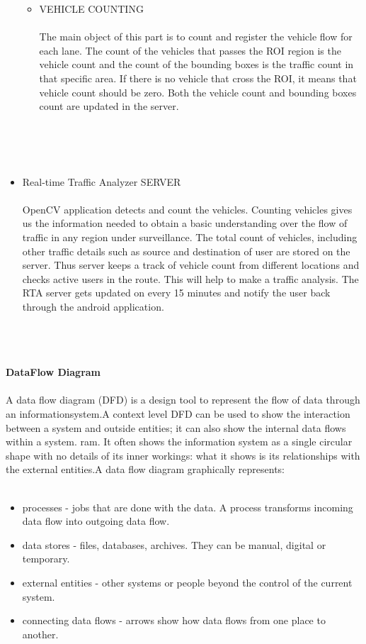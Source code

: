 \begin{itemize}
\begin{itemize}
\item VEHICLE COUNTING\\ \\
The main object of this part is to count and register the vehicle flow for each lane. The count of the vehicles that passes the ROI region is the vehicle count and the count of the bounding boxes is the traffic count in that specific area. If there is no vehicle that cross the ROI, it means that vehicle count should be zero. Both the vehicle count and bounding boxes count are updated in the server. \\ \\
\end{itemize}\\ \\
\newpage
\item Real-time Traffic Analyzer SERVER\\ \\
OpenCV application detects and count the vehicles. Counting vehicles gives us the information needed to obtain a basic understanding over the flow of traffic in any region under surveillance. The total count of vehicles, including other traffic details such as source and destination of user are stored on the server. Thus server keeps a track of vehicle count from different locations and checks active users in the route. This will help to make a traffic analysis. The RTA server gets updated on every 15 minutes and notify the user back through the android application.\\ \\
\end{itemize}
\\ \\


\textbf{DataFlow Diagram}\\
 \\ 


A data flow diagram (DFD) is a design tool to represent the flow of data through an informationsystem.A context level DFD can be used to show the interaction between a system and outside entities; it can also show the internal data flows within a system. ram. It often shows the information system as a single circular shape with
no details of its inner workings: what it shows is its relationships with the external entities.A data flow diagram graphically represents: \\ \\ 
\begin{itemize}
\item processes - jobs that are done with the data. A process transforms incoming data flow into outgoing data flow.
\item data stores - files, databases, archives. They can be manual, digital or temporary.
\item external entities - other systems or people beyond the control of the current system.
\item connecting data flows - arrows show how data flows from one place to another.
\end{itemize}


